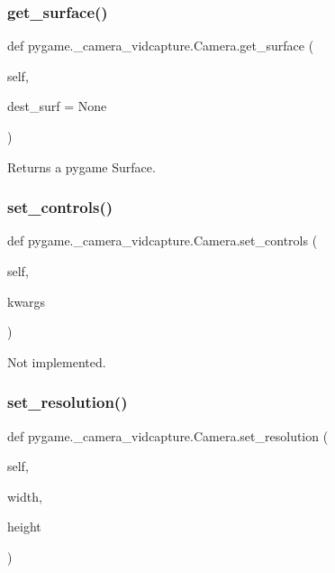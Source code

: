 \subsubsection{\texorpdfstring{get\+\_\+surface()}{get\_surface()}}
{\footnotesize\ttfamily def pygame.\+\_\+camera\+\_\+vidcapture.\+Camera.\+get\+\_\+surface (\begin{DoxyParamCaption}\item[{}]{self,  }\item[{}]{dest\+\_\+surf = {\ttfamily None} }\end{DoxyParamCaption})}

\begin{DoxyVerb}Returns a pygame Surface.
\end{DoxyVerb}
 \mbox{\label{classpygame_1_1__camera__vidcapture_1_1_camera_a1f8f7778475d474010943a72426c2c0f}} 
\subsubsection{\texorpdfstring{set\+\_\+controls()}{set\_controls()}}
{\footnotesize\ttfamily def pygame.\+\_\+camera\+\_\+vidcapture.\+Camera.\+set\+\_\+controls (\begin{DoxyParamCaption}\item[{}]{self,  }\item[{}]{kwargs }\end{DoxyParamCaption})}

\begin{DoxyVerb}Not implemented.
\end{DoxyVerb}
 \mbox{\label{classpygame_1_1__camera__vidcapture_1_1_camera_a4bccaf17ba21d8f8cb604021df667c3d}} 
\subsubsection{\texorpdfstring{set\+\_\+resolution()}{set\_resolution()}}
{\footnotesize\ttfamily def pygame.\+\_\+camera\+\_\+vidcapture.\+Camera.\+set\+\_\+resolution (\begin{DoxyParamCaption}\item[{}]{self,  }\item[{}]{width,  }\item[{}]{height }\end{DoxyParamCaption})}

